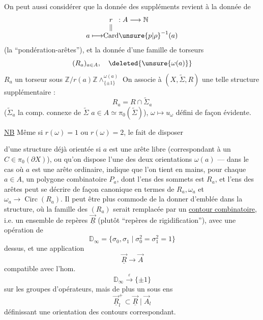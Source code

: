 On peut aussi considérer que la donnée des suppléments revient à la donnée de
\[
 \begin{array}{r@{}c@{}l}
 &r&:A\longrightarrow\mathbb N\\[-.3ex]
 &\Vert&\\[-.3ex]
 a\longmapsto&\operatorname{Card}&\unsure{p|\rho}^{-1}(a)
 \end{array}
\]
(la ``pondération-arêtes''), et la donnée d'une famille de torseurs
\[
 (R_a)_{a\in A},\quad \deleted{\unsure{\omega(a)}}
\]
$R_a$ un torseur sous $\mathbb Z/r(a)\mathbb Z\mathbin{\wedge}^{\omega(a)}_{\{\pm1\}}$
On associe à $(X,\widetilde\Sigma,R)$ une telle structure supplémentaire :
\[
 R_a=R\cap\widetilde\Sigma_a
\]
($\widetilde\Sigma_a$ la comp. connexe de $\widetilde\Sigma$   $a\in A\simeq\pi_0(\widetilde\Sigma)$),
$\omega\longmapsto u_\omega$ défini de façon évidente.

\uline{NB} Même si $r(\omega)=1$ ou $r(\omega)=2$, le fait de disposer

d'une structure déjà orientée si $a$ est une arête libre
(correspondant à un $C\in\pi_0(\partial X)$), ou qu'on dispose
 l'une des deux orientations $\omega(a)$ ---
dans le cas où $a$ est une arête ordinaire, indique que l'on tient en mains,
pour chaque $a\in A$, un polygone combinatoire $P_a$, dont l'ens des sommets
est $R_a$, et l'ens des arêtes peut se décrire 
de façon canonique en termes de $R_a,\omega_a$ et
$\omega_a\longrightarrow\operatorname{Circ}(R_a)$.
Il peut être plus commode de la donner d'emblée dans la structure,
où la famille des $(R_a)$ serait remplacée par un
\uline{contour combinatoire}, i.e. un ensemble de repères
$\vec{\underline R}$ (plutôt ``repères de rigidification''), avec une opération de
\[
 \mathbb D_\infty=\{\sigma_0,\sigma_1\mid\sigma_0^2=\sigma_1^2=1\}
\]
dessus, et une application
\[
 \vec{\underline R}\longrightarrow\vec A
\]
compatible avec l'hom.
\[
 \mathbb D_\infty\xrightarrow{\varepsilon}\{\pm1\}
\]
sur les groupes d'opérateurs, mais de plus un sous ens
\[
 \vec{\underline R}_l^+\subset\vec{\underline R}\mid\vec A_l
\]
définissant une orientation des contours correspondant.

